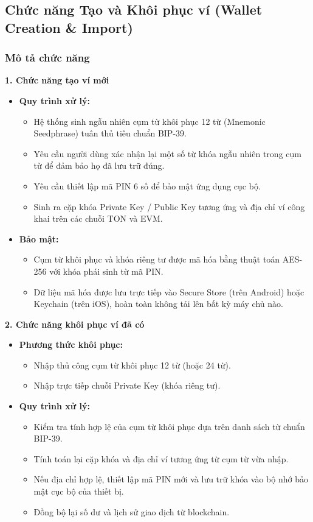 \documentclass[a4paper]{report}
\begin{document}
\subsection{Chức năng Tạo và Khôi phục ví (Wallet Creation \& Import)}

\subsubsection{Mô tả chức năng}

\textbf{1. Chức năng tạo ví mới}
\begin{itemize}
    \item \textbf{Quy trình xử lý:}
    \begin{itemize}
        \item Hệ thống sinh ngẫu nhiên cụm từ khôi phục 12 từ (Mnemonic Seedphrase) tuân thủ tiêu chuẩn BIP-39.
        \item Yêu cầu người dùng xác nhận lại một số từ khóa ngẫu nhiên trong cụm từ để đảm bảo họ đã lưu trữ đúng.
        \item Yêu cầu thiết lập mã PIN 6 số để bảo mật ứng dụng cục bộ.
        \item Sinh ra cặp khóa Private Key / Public Key tương ứng và địa chỉ ví công khai trên các chuỗi TON và EVM.
    \end{itemize}
    
    \item \textbf{Bảo mật:}
    \begin{itemize}
        \item Cụm từ khôi phục và khóa riêng tư được mã hóa bằng thuật toán AES-256 với khóa phái sinh từ mã PIN.
        \item Dữ liệu mã hóa được lưu trực tiếp vào Secure Store (trên Android) hoặc Keychain (trên iOS), hoàn toàn không tải lên bất kỳ máy chủ nào.
    \end{itemize}
\end{itemize}

\textbf{2. Chức năng khôi phục ví đã có}
\begin{itemize}
    \item \textbf{Phương thức khôi phục:}
    \begin{itemize}
        \item Nhập thủ công cụm từ khôi phục 12 từ (hoặc 24 từ).
        \item Nhập trực tiếp chuỗi Private Key (khóa riêng tư).
    \end{itemize}
    
    \item \textbf{Quy trình xử lý:}
    \begin{itemize}
        \item Kiểm tra tính hợp lệ của cụm từ khôi phục dựa trên danh sách từ chuẩn BIP-39.
        \item Tính toán lại cặp khóa và địa chỉ ví tương ứng từ cụm từ vừa nhập.
        \item Nếu địa chỉ hợp lệ, thiết lập mã PIN mới và lưu trữ khóa vào bộ nhớ bảo mật cục bộ của thiết bị.
        \item Đồng bộ lại số dư và lịch sử giao dịch từ blockchain.
    \end{itemize}
\end{itemize}
\end{document}
